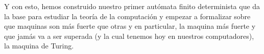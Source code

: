 \documentclass[letterpaper,11pt]{article}
\theoremstyle{plain}
\begin{document}
\begin{framed}
\begin{enumerate}
\begin{center}
                \end{center}
                 Y con esto, hemos construido nuestro primer autómata finito determinista que da la base para estudiar la teoría de la computación y empezar a formalizar sobre que maquinas son más fuerte que otras y en particular, la maquina más fuerte y que jamás va a ser superada (y la cual tenemos hoy en nuestros computadores), la maquina de Turing.
            \end{enumerate}
            
           
            
    \end{framed}
\end{document}
